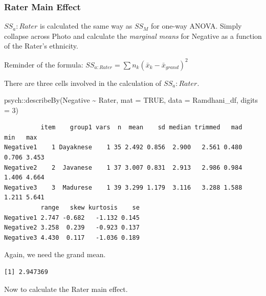 \documentclass[
  11pt,
]{book}
\newenvironment{Shaded}{\begin{snugshade}}{\end{snugshade}}
\newcommand{\AttributeTok}[1]{\textcolor[rgb]{0.77,0.63,0.00}{#1}}
\newcommand{\ConstantTok}[1]{\textcolor[rgb]{0.00,0.00,0.00}{#1}}
\newcommand{\DecValTok}[1]{\textcolor[rgb]{0.00,0.00,0.81}{#1}}
\newcommand{\FunctionTok}[1]{\textcolor[rgb]{0.00,0.00,0.00}{#1}}
\newcommand{\NormalTok}[1]{#1}
\newcommand{\SpecialCharTok}[1]{\textcolor[rgb]{0.00,0.00,0.00}{#1}}
\begin{document}
\hypertarget{rater-main-effect}{%
\subsubsection{Rater Main Effect}\label{rater-main-effect}}

\(SS_a:Rater\) is calculated the same way as \(SS_M\) for one-way ANOVA. Simply collapse across Photo and calculate the \emph{marginal means} for Negative as a function of the Rater's ethnicity.

Reminder of the formula: \(SS_{a:Rater}= \sum n_{k}(\bar{x}_{k}-\bar{x}_{grand})^{2}\)

There are three cells involved in the calculation of \(SS_a:Rater\).

\begin{Shaded}
\begin{Highlighting}[]
\NormalTok{psych}\SpecialCharTok{::}\FunctionTok{describeBy}\NormalTok{(Negative }\SpecialCharTok{\textasciitilde{}}\NormalTok{ Rater, }\AttributeTok{mat =} \ConstantTok{TRUE}\NormalTok{, }\AttributeTok{data =}\NormalTok{ Ramdhani\_df, }\AttributeTok{digits =} \DecValTok{3}\NormalTok{)}
\end{Highlighting}
\end{Shaded}

\begin{verbatim}
          item    group1 vars  n  mean    sd median trimmed   mad   min   max
Negative1    1 Dayaknese    1 35 2.492 0.856  2.900   2.561 0.480 0.706 3.453
Negative2    2  Javanese    1 37 3.007 0.831  2.913   2.986 0.984 1.406 4.664
Negative3    3  Madurese    1 39 3.299 1.179  3.116   3.288 1.588 1.211 5.641
          range   skew kurtosis    se
Negative1 2.747 -0.682   -1.132 0.145
Negative2 3.258  0.239   -0.923 0.137
Negative3 4.430  0.117   -1.036 0.189
\end{verbatim}

Again, we need the grand mean.

\begin{Shaded}
\end{Shaded}

\begin{verbatim}
[1] 2.947369
\end{verbatim}

Now to calculate the Rater main effect.
\end{document}
